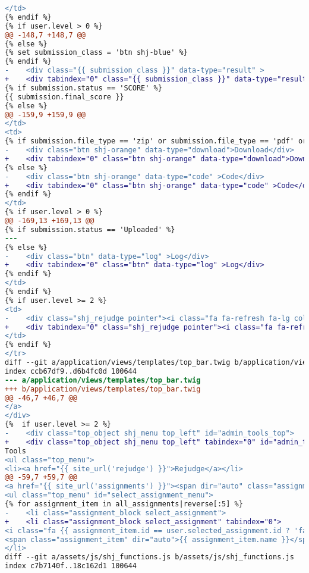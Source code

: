 \begin{itemize}
\begin{lstlisting}[language=diff, caption=Perubahan untuk mematuhi kriteria 2.1.1, label=lst_2.1.1, basicstyle=\ttfamily, frame=single,
columns=fullflexible, keepspaces=true, breaklines=true]
</td>
{% endif %}
{% if user.level > 0 %}
@@ -148,7 +148,7 @@
{% else %}
{% set submission_class = 'btn shj-blue' %}
{% endif %}
-    <div class="{{ submission_class }}" data-type="result" >
+    <div tabindex="0" class="{{ submission_class }}" data-type="result" >
{% if submission.status == 'SCORE' %}
{{ submission.final_score }}
{% else %}
@@ -159,9 +159,9 @@
</td>
<td>
{% if submission.file_type == 'zip' or submission.file_type == 'pdf' or submission.file_type == 'txt' %}
-    <div class="btn shj-orange" data-type="download">Download</div>
+    <div tabindex="0" class="btn shj-orange" data-type="download">Download</div>
{% else %}
-    <div class="btn shj-orange" data-type="code" >Code</div>
+    <div tabindex="0" class="btn shj-orange" data-type="code" >Code</div>
{% endif %}
</td>
{% if user.level > 0 %}
@@ -169,13 +169,13 @@
{% if submission.status == 'Uploaded' %}
---
{% else %}
-    <div class="btn" data-type="log" >Log</div>
+    <div tabindex="0" class="btn" data-type="log" >Log</div>
{% endif %}
</td>
{% endif %}
{% if user.level >= 2 %}
<td>
-    <div class="shj_rejudge pointer"><i class="fa fa-refresh fa-lg color10"></i></div>
+    <div tabindex="0" class="shj_rejudge pointer"><i class="fa fa-refresh fa-lg color10"></i></div>
</td>
{% endif %}
</tr>
diff --git a/application/views/templates/top_bar.twig b/application/views/templates/top_bar.twig
index ccb67df9..d6b4fc0d 100644
--- a/application/views/templates/top_bar.twig
+++ b/application/views/templates/top_bar.twig
@@ -46,7 +46,7 @@
</a>
</div>
{%  if user.level >= 2 %}
-    <div class="top_object shj_menu top_left" id="admin_tools_top">
+    <div class="top_object shj_menu top_left" tabindex="0" id="admin_tools_top">
Tools
<ul class="top_menu">
<li><a href="{{ site_url('rejudge') }}">Rejudge</a></li>
@@ -59,7 +59,7 @@
<a href="{{ site_url('assignments') }}"><span dir="auto" class="assignment_name">{{ user.selected_assignment.name|length > 30 ? user.selected_assignment.name|slice(0, 30) ~ '...' : user.selected_assignment.name }}</span></a>
<ul class="top_menu" id="select_assignment_menu">
{% for assignment_item in all_assignments|reverse[:5] %}
-    <li class="assignment_block select_assignment">
+    <li class="assignment_block select_assignment" tabindex="0">
<i class="fa {{ assignment_item.id == user.selected_assignment.id ? 'fa-check-square-o color6' : 'fa-square-o' }}" data-id="{{ assignment_item.id }}"></i>
<span class="assignment_item" dir="auto">{{ assignment_item.name }}</span>
</li>
diff --git a/assets/js/shj_functions.js b/assets/js/shj_functions.js
index c7b7140f..18c162d1 100644

\end{lstlisting}
\end{itemize}
